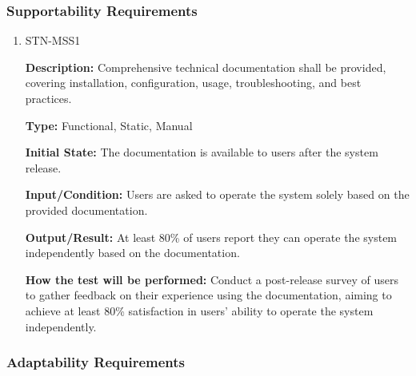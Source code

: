 \documentclass[12pt, titlepage]{article}
\begin{document}
\subsubsection{Supportability Requirements}

\begin{enumerate}

\item{STN-MSS1\\}

\textbf{Description:} Comprehensive technical documentation shall be provided, covering installation, configuration, usage, troubleshooting, and best practices.

\textbf{Type:} Functional, Static, Manual

\textbf{Initial State:} The documentation is available to users after the system release.

\textbf{Input/Condition:} Users are asked to operate the system solely based on the provided documentation.

\textbf{Output/Result:} At least 80\% of users report they can operate the system independently based on the documentation.

\textbf{How the test will be performed:} Conduct a post-release survey of users to gather feedback on their experience using the documentation, aiming to achieve at least 80\% satisfaction in users' ability to operate the system independently.

\end{enumerate}

\subsubsection{Adaptability Requirements}
\end{document}
